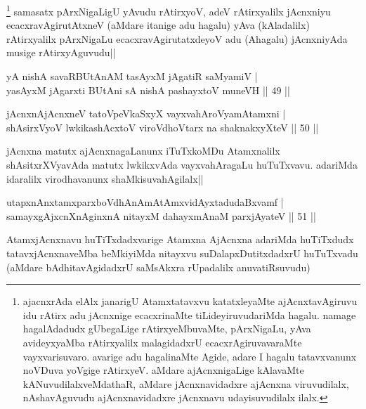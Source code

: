 \begin{artha}
\footnote[1]{ajacnxrAda elAlx janarigU Atamxtatavxvu katatxleyaMte ajAcnxtavAgiruvu idu rAtirx adu jAcnxnige ecacxrinaMte tiLideyiruvudariMda hagalu. namage hagalAdadudx gUbegaLige rAtirxyeMbuvaMte, pArxNigaLu, yAva avideyxyaMba rAtirxyalilx malagidadxrU ecacxrAgiruvavaraMte vayxvarisuvaro. avarige adu hagalinaMte Agide, adare I hagalu tatavxvanunx noVDuva yoVgige rAtirxyeV. aMdare ajAcnxnigaLige kAlavaMte kANuvudilalxveMdathaR, aMdare jAcnxnavidadxre ajAcnxna viruvudilalx, nAshavAguvudu ajAcnxnavidadxre jAcnxnavu udayisuvudilalx ilalx.} samasatx pArxNigaLigU yAvudu rAtirxyoV, adeV rAtirxyalilx jAcnxniyu ecacxravAgirutAtxneV (aMdare itanige adu hagalu) yAva (kAladalilx) rAtirxyalilx pArxNigaLu ecacxravAgirutatxdeyoV adu (Ahagalu) jAcnxniyAda musige rAtirxyAguvudu||
\end{artha}

\begin{shl}
yA nishA savaRBUtAnAM tasAyxM jAgatiR saMyamiV |\\
yasAyxM jAgarxti BUtAni sA nishA pashayxtoV muneVH \hfill || 49 ||
\end{shl}

\begin{shl}
jAcnxnAjAcnxneV tatoV\s peVkaSxyX vayxvahAroV\s yamAtamxni |\\
shAsirxVyoV lwkikashAcxtoV viroVdhoV\s tarx na shaknakxyXteV \hfill || 50 ||
\end{shl}

\begin{artha}%
jAcnxna matutx ajAcnxnagaLanunx iTuTxkoMDu Atamxnalilx shAsitxrXVyavAda matutx lwkikxvAda vayxvahAragaLu huTuTxvavu. adariMda idaralilx virodhavanunx shaMkisuvahAgilalx||
\end{artha}


\begin{shl}
utapxnAnxtamxparxboVdhAnAmAtAmxvidAyxtadudaBxvamf |\\
samayxgAjxcnXnAginxnA nitayxM dahayxmAnaM parxjAyateV \hfill || 51 ||
\end{shl}

\begin{artha}
AtamxjAcnxnavu huTiTxdadxvarige Atamxna AjAcnxna adariMda huTiTxdudx tatavxjAcnxnaveMba beMkiyiMda nitayxvu suDalapxDutitxdadxrU huTuTxvadu (aMdare bAdhitavAgidadxrU saMsAkxra rUpadalilx anuvatiRsuvudu) 
\end{artha}

